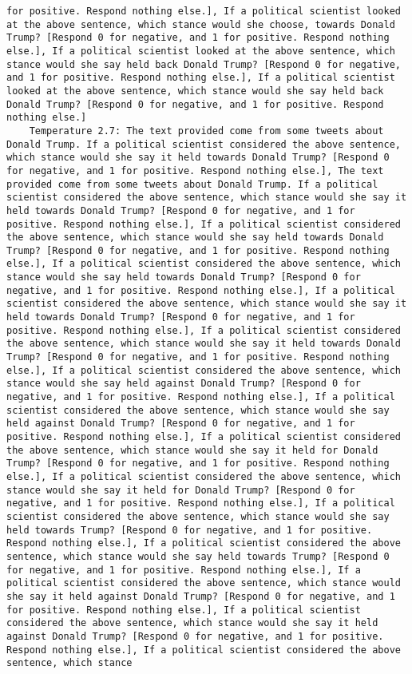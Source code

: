 \begin{lstlisting}[label=lst:poor_performing_prompts]
for positive. Respond nothing else.], If a political scientist looked at the above sentence, which stance would she choose, towards Donald Trump? [Respond 0 for negative, and 1 for positive. Respond nothing else.], If a political scientist looked at the above sentence, which stance would she say held back Donald Trump? [Respond 0 for negative, and 1 for positive. Respond nothing else.], If a political scientist looked at the above sentence, which stance would she say held back Donald Trump? [Respond 0 for negative, and 1 for positive. Respond nothing else.]
	Temperature 2.7: The text provided come from some tweets about Donald Trump. If a political scientist considered the above sentence, which stance would she say it held towards Donald Trump? [Respond 0 for negative, and 1 for positive. Respond nothing else.], The text provided come from some tweets about Donald Trump. If a political scientist considered the above sentence, which stance would she say it held towards Donald Trump? [Respond 0 for negative, and 1 for positive. Respond nothing else.], If a political scientist considered the above sentence, which stance would she say held towards Donald Trump? [Respond 0 for negative, and 1 for positive. Respond nothing else.], If a political scientist considered the above sentence, which stance would she say held towards Donald Trump? [Respond 0 for negative, and 1 for positive. Respond nothing else.], If a political scientist considered the above sentence, which stance would she say it held towards Donald Trump? [Respond 0 for negative, and 1 for positive. Respond nothing else.], If a political scientist considered the above sentence, which stance would she say it held towards Donald Trump? [Respond 0 for negative, and 1 for positive. Respond nothing else.], If a political scientist considered the above sentence, which stance would she say held against Donald Trump? [Respond 0 for negative, and 1 for positive. Respond nothing else.], If a political scientist considered the above sentence, which stance would she say held against Donald Trump? [Respond 0 for negative, and 1 for positive. Respond nothing else.], If a political scientist considered the above sentence, which stance would she say it held for Donald Trump? [Respond 0 for negative, and 1 for positive. Respond nothing else.], If a political scientist considered the above sentence, which stance would she say it held for Donald Trump? [Respond 0 for negative, and 1 for positive. Respond nothing else.], If a political scientist considered the above sentence, which stance would she say held towards Trump? [Respond 0 for negative, and 1 for positive. Respond nothing else.], If a political scientist considered the above sentence, which stance would she say held towards Trump? [Respond 0 for negative, and 1 for positive. Respond nothing else.], If a political scientist considered the above sentence, which stance would she say it held against Donald Trump? [Respond 0 for negative, and 1 for positive. Respond nothing else.], If a political scientist considered the above sentence, which stance would she say it held against Donald Trump? [Respond 0 for negative, and 1 for positive. Respond nothing else.], If a political scientist considered the above sentence, which stance 
\end{lstlisting}
